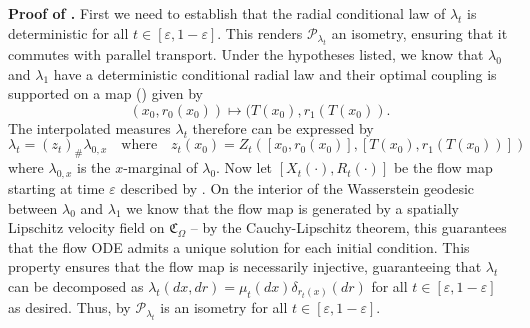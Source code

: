 \documentclass[11pt]{article}
\begin{document}
\noindent \textbf{Proof of .} First we need to establish that the radial conditional law of $\lambda_t$ is deterministic for all $t \in [\varepsilon, 1-\varepsilon]$. This renders $\mathcal{P}_{\lambda_t}$ an isometry, ensuring that it commutes with parallel transport. Under the hypotheses listed, we know that $\lambda_0$ and $\lambda_1$ have a deterministic conditional radial law and their optimal coupling is supported on a map () given by
\[(x_0, r_0(x_0)) \mapsto (T(x_0), r_1(T(x_0)).\]
The interpolated measures $\lambda_t$ therefore can be expressed by 
\[\lambda_t = (z_t)_\#\lambda_{0,x} \quad \text{where}\quad z_t(x_0) = Z_t([x_0, r_0(x_0)], [T(x_0), r_1(T(x_0))])\]
where $\lambda_{0, x}$ is the $x$-marginal of $\lambda_0$. Now let $[X_t(\cdot), R_t(\cdot )]$ be the flow map starting at time $\varepsilon$ described by . On the interior of the Wasserstein geodesic between $\lambda_0$ and $\lambda_1$ we know that the flow map is generated by a spatially Lipschitz velocity field on $\mathfrak{C}_\Omega$ -- by the Cauchy-Lipschitz theorem, this guarantees that the flow ODE admits a unique solution for each initial condition. This property ensures that the flow map is necessarily injective, guaranteeing that $\lambda_t$ can be decomposed as $\lambda_t(dx, dr) = \mu_t(dx)\delta_{r_t(x)}(dr)$ for all $t \in [\varepsilon, 1 - \varepsilon]$ as desired. Thus, by  $\mathcal{P}_{\lambda_t}$ is an isometry for all $t \in [\varepsilon, 1 - \varepsilon]$.
\end{document}
